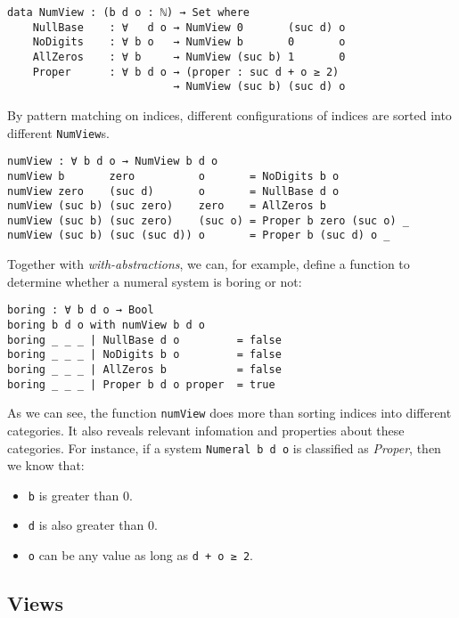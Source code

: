 \documentclass[../thesis.tex]{subfiles}
\begin{document}
\begin{lstlisting}
data NumView : (b d o : ℕ) → Set where
    NullBase    : ∀   d o → NumView 0       (suc d) o
    NoDigits    : ∀ b o   → NumView b       0       o
    AllZeros    : ∀ b     → NumView (suc b) 1       0
    Proper      : ∀ b d o → (proper : suc d + o ≥ 2)
                          → NumView (suc b) (suc d) o
\end{lstlisting}

By pattern matching on indices, different configurations of indices are sorted into
different {\lstinline|NumView|}s.

\begin{lstlisting}
numView : ∀ b d o → NumView b d o
numView b       zero          o       = NoDigits b o
numView zero    (suc d)       o       = NullBase d o
numView (suc b) (suc zero)    zero    = AllZeros b
numView (suc b) (suc zero)    (suc o) = Proper b zero (suc o) _
numView (suc b) (suc (suc d)) o       = Proper b (suc d) o _
\end{lstlisting}

Together with \textit{with-abstractions}, we can, for example, define a function
to determine whether a numeral system is boring or not:

\begin{lstlisting}
boring : ∀ b d o → Bool
boring b d o with numView b d o
boring _ _ _ | NullBase d o         = false
boring _ _ _ | NoDigits b o         = false
boring _ _ _ | AllZeros b           = false
boring _ _ _ | Proper b d o proper  = true
\end{lstlisting}

As we can see, the function {\lstinline|numView|} does more than sorting indices
into different categories. It also reveals relevant infomation and properties
about these categories. For instance, if a system {\lstinline|Numeral b d o|}
is classified as \textit{Proper}, then we know that:

\begin{itemize}
    \item {\lstinline|b|} is greater than $ 0 $.
    \item {\lstinline|d|} is also greater than $ 0 $.
    \item {\lstinline|o|} can be any value as long as {\lstinline|d + o ≥ 2|}.
\end{itemize}

\subsection{Views}
\end{document}
